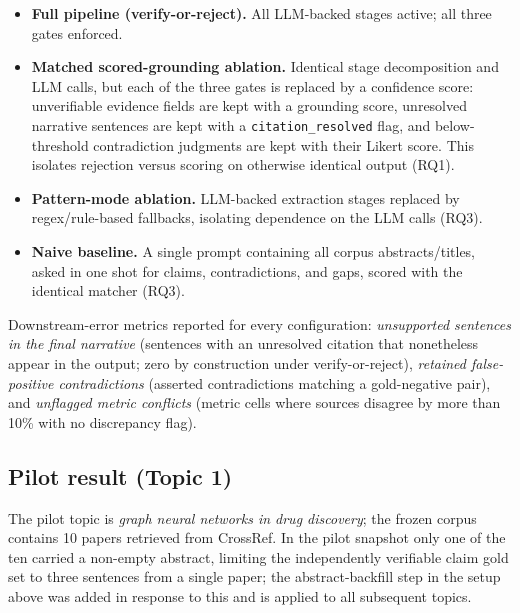 \documentclass[11pt]{article}
\begin{document}
\begin{itemize}
 \item \textbf{Full pipeline (verify-or-reject).} All LLM-backed stages active;
 all three gates enforced.
 \item \textbf{Matched scored-grounding ablation.} Identical stage
 decomposition and LLM calls, but each of the three gates is replaced by a
 confidence score: unverifiable evidence fields are kept with a grounding
 score, unresolved narrative sentences are kept with a \texttt{citation\_resolved}
 flag, and below-threshold contradiction judgments are kept with their Likert
 score. This isolates rejection versus scoring on otherwise identical output
 (RQ1).
 \item \textbf{Pattern-mode ablation.} LLM-backed extraction stages replaced by
 regex/rule-based fallbacks, isolating dependence on the LLM calls (RQ3).
 \item \textbf{Naive baseline.} A single prompt containing all corpus
 abstracts/titles, asked in one shot for claims, contradictions, and gaps,
 scored with the identical matcher (RQ3).
\end{itemize}

Downstream-error metrics reported for every configuration:
\emph{unsupported sentences in the final narrative} (sentences with an
unresolved citation that nonetheless appear in the output; zero by construction
under verify-or-reject), \emph{retained false-positive contradictions} (asserted
contradictions matching a gold-negative pair), and \emph{unflagged metric
conflicts} (metric cells where sources disagree by more than 10\% with no
discrepancy flag).

\subsection{Pilot result (Topic 1)}
\label{sec:pilot}

The pilot topic is \textit{graph neural networks in drug discovery}; the frozen
corpus contains 10 papers retrieved from CrossRef. In the pilot snapshot only
one of the ten carried a non-empty abstract, limiting the independently
verifiable claim gold set to three sentences from a single paper; the
abstract-backfill step in the setup above was added in response to this and is
applied to all subsequent topics.
\end{document}
